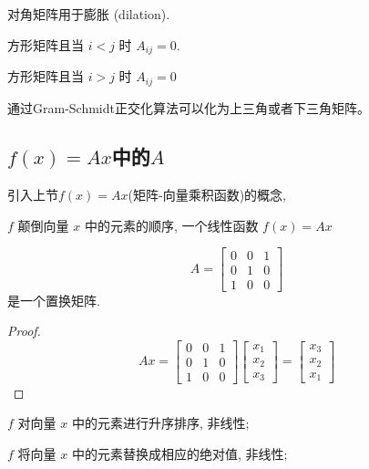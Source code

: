 对角矩阵用于膨胀 (dilation).

\begin{definition}[下三角矩阵]
    方形矩阵且当 $ i<j $ 时 $ A_{i j}=0 $.
\end{definition}

\begin{definition}[上三角矩阵]
    方形矩阵且当 $ i>j $ 时 $ A_{i j}=0 $
\end{definition}

通过Gram-Schmidt正交化算法可以化为上三角或者下三角矩阵。

\subsection{$f(x)=A x$中的$A$}

引入上节$f(x)=A x$(矩阵-向量乘积函数)的概念,

\begin{example}
    $ f $ 颠倒向量 $ x $ 中的元素的顺序, 一个线性函数 $ f(x)=A x $

    $$ A=\left[\begin{array}{lll}0 & 0 & 1 \\ 0 & 1 & 0 \\ 1 & 0 & 0\end{array}\right] $$是一个置换矩阵.
\end{example}

\begin{proof}
    $$ A x=\left[\begin{array}{lll}0 & 0 & 1 \\ 0 & 1 & 0 \\ 1 & 0 & 0\end{array}\right]\left[\begin{array}{l}x_{1} \\ x_{2} \\ x_{3}\end{array}\right]=\left[\begin{array}{l}x_{3} \\ x_{2} \\ x_{1}\end{array}\right] $$
\end{proof}

\begin{example}
    $ f $ 对向量 $ x $ 中的元素进行升序排序, 非线性;
\end{example}

\begin{example}
    $ f $ 将向量 $ x $ 中的元素替换成相应的绝对值, 非线性;
\end{example}

